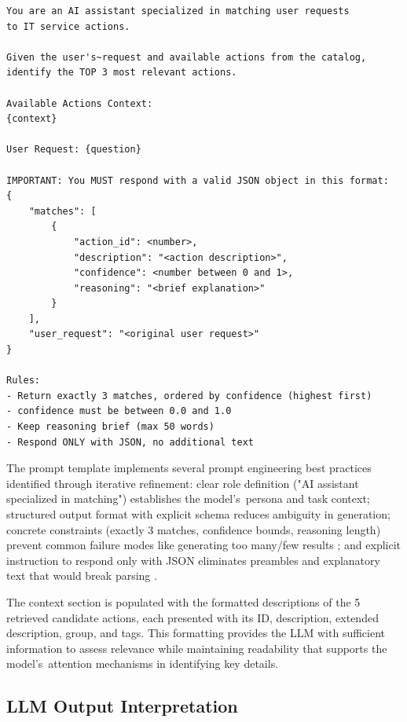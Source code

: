 \begin{listing}[htbp]
\begin{verbatim}
You are an AI assistant specialized in matching user requests 
to IT service actions.

Given the user's~request and available actions from the catalog, 
identify the TOP 3 most relevant actions.

Available Actions Context:
{context}

User Request: {question}

IMPORTANT: You MUST respond with a valid JSON object in this format:
{
    "matches": [
        {
            "action_id": <number>,
            "description": "<action description>",
            "confidence": <number between 0 and 1>,
            "reasoning": "<brief explanation>"
        }
    ],
    "user_request": "<original user request>"
}

Rules:
- Return exactly 3 matches, ordered by confidence (highest first)
- confidence must be between 0.0 and 1.0
- Keep reasoning brief (max 50 words)
- Respond ONLY with JSON, no additional text
\end{verbatim}
\caption{Prompt Template for Action Recommendation}
\label{lst:prompt_template}
\end{listing}

The prompt template implements several prompt engineering best practices \cite{Beurer_Kellner_2023} identified through iterative refinement: clear role definition ("AI assistant specialized in matching") establishes the model's~persona and task context; structured output format with explicit schema reduces ambiguity in generation; concrete constraints (exactly 3 matches, confidence bounds, reasoning length) prevent common failure modes like generating too many/few results \cite{Beurer_Kellner_2023}; and explicit instruction to respond only with JSON eliminates preambles and explanatory text that would break parsing \cite{Beurer_Kellner_2023}.

The context section is populated with the formatted descriptions of the 5 retrieved candidate actions, each presented with its ID, description, extended description, group, and tags. This formatting provides the LLM with sufficient information to assess relevance while maintaining readability that supports the model's~attention mechanisms in identifying key details.

\subsection{LLM Output Interpretation}

